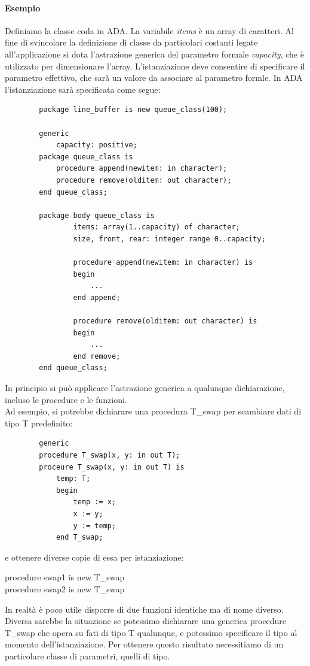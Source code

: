 \documentclass{article}
\begin{document}
	\paragraph*{Esempio}
	Definiamo la classe coda in ADA. La variabile \textit{items} è un array di caratteri. Al fine di svincolare la definizione di classe da particolari costanti legate all'applicazione si dota l'astrazione generica del parametro formale \textit{capacity}, che è utilizzato per dimensionare l'array. L'istanziazione deve consentire di specificare il parametro effettivo, che sarà un valore da associare al parametro formle. 
	In ADA l'istanziazione sarà specificata come segue:
	\begin{verbatim}
		package line_buffer is new queue_class(100);

		generic
			capacity: positive;
		package queue_class is
			procedure append(newitem: in character);
			procedure remove(olditem: out character);
		end queue_class;

		package body queue_class is
				items: array(1..capacity) of character;
				size, front, rear: integer range 0..capacity;

				procedure append(newitem: in character) is
				begin
					...
				end append;

				procedure remove(olditem: out character) is
				begin
					...
				end remove;
		end queue_class;
	\end{verbatim}
	In principio si può applicare l'astrazione generica a qualunque dichiarazione, incluso le procedure e le funzioni. \\
	Ad esempio, si potrebbe dichiarare una procedura T\_swap per scambiare dati di tipo T predefinito:
	\begin{verbatim}
		generic
		procedure T_swap(x, y: in out T);
		proceure T_swap(x, y: in out T) is
			temp: T;
			begin
				temp := x;
				x := y;
				y := temp;
			end T_swap;
	\end{verbatim}
	e ottenere diverse copie di essa per istanziazione:
	\begin{center}
		procedure swap1 is new T\_swap \\
		procedure swap2 is new T\_swap
	\end{center}
	In realtà è poco utile disporre di due funzioni identiche ma di nome diverso. Diversa sarebbe la situazione se potessimo dichiarare una generica procedure T\_swap che opera su fati di tipo T qualunque, e potessimo specificare il tipo al momento dell'istanziazione. Per ottenere questo risultato necessitiamo di un particolare classe di parametri, quelli di tipo.\\
\end{document}
